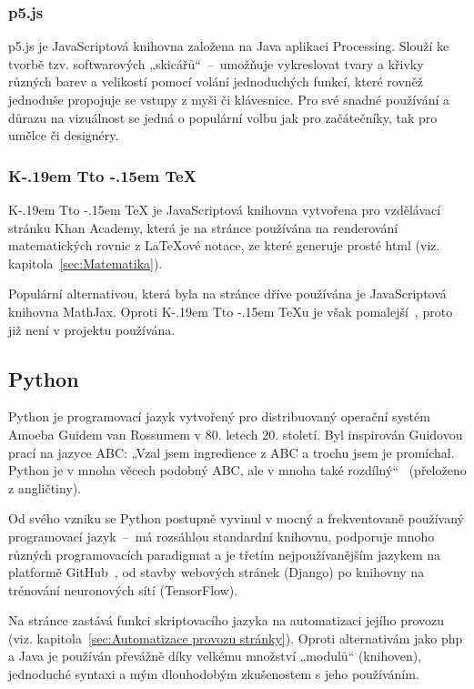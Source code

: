 \documentclass[a4paper, 12pt, twoside]{article}
\makeatletter
\DeclareRobustCommand{\KaTeX}{%
  K\kern -.19em
  {\sbox \z@ T\vbox to\ht \z@ {\hbox{%
  \check@mathfonts
  \fontsize\sf@size\z@
  \selectfont A}%
  \vss}%
}\kern -.15em
\TeX}
\makeatother
\begin{document}
  \subsubsection{p5.js} \label{sec:p5.js}
  p5.js je JavaScriptová knihovna založena na Java aplikaci Processing. Slouží ke tvorbě tzv. softwarových „skicářů“~--~umožňuje vykreslovat tvary a křivky různých barev a velikostí pomocí volání jednoduchých funkcí, které rovněž jednoduše propojuje se vstupy z myši či klávesnice. Pro své snadné používání a důrazu na vizuálnost se jedná o populární volbu jak pro začátečníky, tak pro umělce či designéry.


  \subsubsection{\texorpdfstring{\KaTeX}{KaTeX}} \label{sec:KaTeX}
  \KaTeX{} je JavaScriptová knihovna vytvořena pro vzdělávací stránku Khan Academy, která je na stránce používána na renderování matematických rovnic z \LaTeX ové notace, ze které generuje prosté \gls{html} (viz. kapitola~\ref{sec:Matematika}).

  Populární alternativou, která byla na stránce dříve používána je JavaScriptová knihovna MathJax. Oproti \KaTeX u je však pomalejší~\cite{katex-mathjax-comparison}, proto již není v projektu používána.


  \subsection{Python} \label{sec:Python}
  Python je programovací jazyk vytvořený pro distribuovaný operační systém Amoeba Guidem van Rossumem v 80. letech 20. století. Byl inspirován Guidovou prací na jazyce ABC: „Vzal jsem ingredience z ABC a trochu jsem je promíchal. Python je v mnoha věcech podobný ABC, ale v mnoha také rozdílný“~\cite{making-of-python} (přeloženo z angličtiny).

  Od svého vzniku se Python postupně vyvinul v mocný a frekventovaně používaný programovací jazyk~--~má rozsáhlou standardní knihovnu, podporuje mnoho různých programovacích paradigmat a je třetím nejpoužívanějším jazykem na platformě GitHub~\cite{github-statistics}, od stavby webových stránek (Django) po knihovny na trénování neuronových sítí (TensorFlow).

  Na stránce zastává funkci skriptovacího jazyka na automatizaci jejího provozu (viz. kapitola~\ref{sec:Automatizace provozu stránky}). Oproti alternativám jako \gls{php} a Java je používán převážně díky velkému množství „modulů“ (knihoven), jednoduché syntaxi a mým dlouhodobým zkušenostem s jeho používáním.
\end{document}
